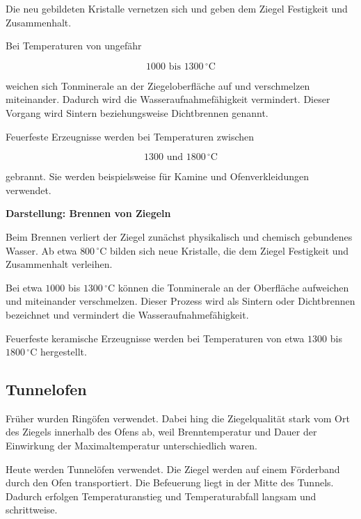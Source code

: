 \documentclass[
  12pt,
  a4paper,
  oneside
]{scrreprt}
\begin{document}
Die neu gebildeten Kristalle vernetzen sich und geben dem Ziegel
Festigkeit und Zusammenhalt.


Bei Temperaturen von ungefähr

\begin{equation}
  1000 \text{ bis } 1300\,^\circ\mathrm{C}
\end{equation}

weichen sich Tonminerale an der Ziegeloberfläche auf und verschmelzen
miteinander. Dadurch wird die Wasseraufnahmefähigkeit vermindert.
Dieser Vorgang wird Sintern beziehungsweise Dichtbrennen genannt.


Feuerfeste Erzeugnisse werden bei Temperaturen zwischen

\begin{equation}
  1300 \text{ und } 1800\,^\circ\mathrm{C}
\end{equation}

gebrannt. Sie werden beispielsweise für Kamine und Ofenverkleidungen
verwendet.


\begin{darstellungsbox}
\textbf{Darstellung: Brennen von Ziegeln}

Beim Brennen verliert der Ziegel zunächst physikalisch und chemisch
gebundenes Wasser. Ab etwa $800\,^\circ\mathrm{C}$ bilden sich neue
Kristalle, die dem Ziegel Festigkeit und Zusammenhalt verleihen.

Bei etwa $1000$ bis $1300\,^\circ\mathrm{C}$ können die
Tonminerale an der Oberfläche aufweichen und miteinander
verschmelzen. Dieser Prozess wird als Sintern oder Dichtbrennen
bezeichnet und vermindert die Wasseraufnahmefähigkeit.

Feuerfeste keramische Erzeugnisse werden bei Temperaturen von etwa
$1300$ bis $1800\,^\circ\mathrm{C}$ hergestellt.
\end{darstellungsbox}

\subsection{Tunnelofen}

Früher wurden Ringöfen verwendet. Dabei hing die Ziegelqualität stark
vom Ort des Ziegels innerhalb des Ofens ab, weil Brenntemperatur und
Dauer der Einwirkung der Maximaltemperatur unterschiedlich waren.


Heute werden Tunnelöfen verwendet. Die Ziegel werden auf einem
Förderband durch den Ofen transportiert. Die Befeuerung liegt in der
Mitte des Tunnels. Dadurch erfolgen Temperaturanstieg und
Temperaturabfall langsam und schrittweise.
\end{document}
